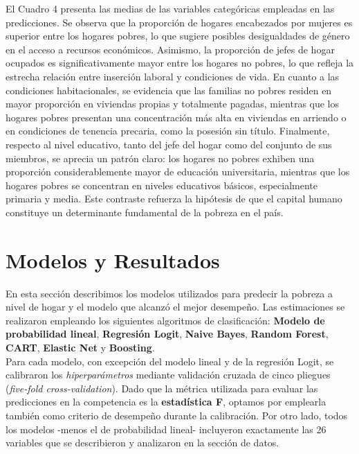 \documentclass[12pt,a4paper,onecolumn]{article}
\begin{document}
El Cuadro 4 presenta las medias de las variables categóricas empleadas en las predicciones. Se observa que la proporción de hogares encabezados por mujeres es superior entre los hogares pobres, lo que sugiere posibles desigualdades de género en el acceso a recursos económicos. Asimismo, la proporción de jefes de hogar ocupados es significativamente mayor entre los hogares no pobres, lo que refleja la estrecha relación entre inserción laboral y condiciones de vida. En cuanto a las condiciones habitacionales, se evidencia que las familias no pobres residen en mayor proporción en viviendas propias y totalmente pagadas, mientras que los hogares pobres presentan una concentración más alta en viviendas en arriendo o en condiciones de tenencia precaria, como la posesión sin título. Finalmente, respecto al nivel educativo, tanto del jefe del hogar como del conjunto de sus miembros, se aprecia un patrón claro: los hogares no pobres exhiben una proporción considerablemente mayor de educación universitaria, mientras que los hogares pobres se concentran en niveles educativos básicos, especialmente primaria y media. Este contraste refuerza la hipótesis de que el capital humano constituye un determinante fundamental de la pobreza en el país.\\

\section{Modelos y Resultados}
En esta sección describimos los modelos utilizados para predecir la pobreza a nivel de hogar y el modelo que alcanzó el mejor desempeño. Las estimaciones se realizaron empleando los siguientes algoritmos de clasificación: \textbf{Modelo de probabilidad lineal},
\textbf{Regresión Logit}, \textbf{Naive Bayes}, \textbf{Random Forest}, \textbf{CART}, \textbf{Elastic Net} y \textbf{Boosting}. \\

Para cada modelo, con excepción del modelo lineal y de la regresión Logit, se calibraron los \textit{hiperparámetros} mediante 
validación cruzada de cinco pliegues (\textit{five-fold cross-validation}). 
Dado que la métrica utilizada para evaluar las predicciones en la competencia es la \textbf{estadística F}, optamos por emplearla también como criterio de desempeño durante la calibración. Por otro lado, todos los modelos -menos el de probabilidad lineal- incluyeron exactamente las 26 variables que se describieron y analizaron en la sección de datos.  \\
\end{document}

